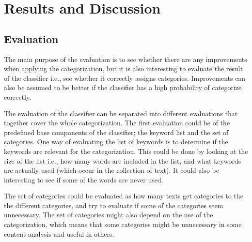 \documentclass[english,a4paper]{ifimaster}
\begin{document}
\part{Results and Discussion}

\chapter{Evaluation}
The main purpose of the evaluation is to see whether there are any improvements when applying the categorization, but it is also interesting to evaluate the result of the classifier i.e., see whether it correctly assigns categories. Improvements can also be assumed to be better if the classifier has a high probability of categorize correctly.



The evaluation of the classifier can be separated into different evaluations that together cover the whole categorization. 
The first evaluation could be of the predefined base components of the classifier; the keyword list and the set of categories. One way of evaluating the list of keywords is to determine if the keywords are relevant for the categorization. This could be done by looking at the size of the list i.e., how many words are included in the list, and what keywords are actually used (which occur in the collection of text). It could also be interesting to see if some of the words are never used. 

The set of categories could be evaluated as how many texts get categories to the the different categories, and try to evaluate if some of the categories seem unnecessary. The set of categories might also depend on the use of the categorization, which means that some categories might be unnecessary in some content analysis and useful in others. 
\end{document}
